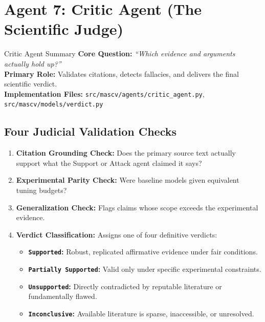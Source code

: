 \documentclass[11pt,a4paper]{article}
\begin{document}
\section{Agent 7: Critic Agent (The Scientific Judge)}

\begin{agentbox}{Critic Agent Summary}
\textbf{Core Question:} \textit{``Which evidence and arguments actually hold up?''}\\
\textbf{Primary Role:} Validates citations, detects fallacies, and delivers the final scientific verdict.\\
\textbf{Implementation Files:} \texttt{src/mascv/agents/critic\_agent.py}, \texttt{src/mascv/models/verdict.py}
\end{agentbox}

\subsection{Four Judicial Validation Checks}
\begin{enumerate}[leftmargin=*]
    \item \textbf{Citation Grounding Check:} Does the primary source text actually support what the Support or Attack agent claimed it says?
    \item \textbf{Experimental Parity Check:} Were baseline models given equivalent tuning budgets?
    \item \textbf{Generalization Check:} Flags claims whose scope exceeds the experimental evidence.
    \item \textbf{Verdict Classification:} Assigns one of four definitive verdicts:
    \begin{itemize}
        \item \textbf{\texttt{Supported}:} Robust, replicated affirmative evidence under fair conditions.
        \item \textbf{\texttt{Partially Supported}:} Valid only under specific experimental constraints.
        \item \textbf{\texttt{Unsupported}:} Directly contradicted by reputable literature or fundamentally flawed.
        \item \textbf{\texttt{Inconclusive}:} Available literature is sparse, inaccessible, or unresolved.
    \end{itemize}
\end{enumerate}

\end{document}

